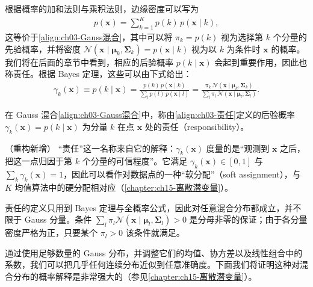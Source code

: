 \documentclass[../../main.tex]{subfiles}
\begin{document}
根据概率的加和法则与乘积法则，边缘密度可以写为
\begin{align}
p(\boldsymbol{x})=\sum_{k=1}^{K}p(k)\,p(\boldsymbol{x}\mid k),
\label{align:ch03-混合生成式}
\end{align}
这等价于\eqref{align:ch03-Gauss混合}，其中可以将 $\pi_{k}=p(k)$ 视为选择第 $k$ 个分量的先验概率，并将密度 $\mathcal{N}(\boldsymbol{x}\mid\boldsymbol{\mu}_{k},\boldsymbol{\Sigma}_{k})=p(\boldsymbol{x}\mid k)$ 视为以 $k$ 为条件时 $\boldsymbol{x}$ 的概率。我们将在后面的章节中看到，相应的后验概率 $p(k\mid\boldsymbol{x})$ 会起到重要作用，因此也称责任。根据 Bayes 定理，这些可以由下式给出：
\begin{align}
\gamma_{k}(\boldsymbol{x})\equiv p(k\mid\boldsymbol{x})=\frac{p(k)\,p(\boldsymbol{x}\mid k)}{\sum_{l}p(l)\,p(\boldsymbol{x}\mid l)}=\frac{\pi_{k}\,\mathcal{N}(\boldsymbol{x}\mid\boldsymbol{\mu}_{k},\boldsymbol{\Sigma}_{k})}{\sum_{l}\pi_{l}\,\mathcal{N}(\boldsymbol{x}\mid\boldsymbol{\mu}_{l},\boldsymbol{\Sigma}_{l})}.
\label{align:ch03-责任}
\end{align}

\begin{definition}[责任]\label{definition:ch03-责任}
在 Gauss 混合\eqref{align:ch03-Gauss混合}中，称由\eqref{align:ch03-责任}定义的后验概率 $\gamma_k(\boldsymbol{x})=p(k\mid\boldsymbol{x})$ 为分量 $k$ 在点 $\boldsymbol{x}$ 处的责任（responsibility）。
\end{definition}

\begin{remark}（重构新增）
“责任”这一名称来自它的解释：$\gamma_k(\boldsymbol{x})$ 度量的是“观测到 $\boldsymbol{x}$ 之后，把这一点归因于第 $k$ 个分量的可信程度”。它满足 $\gamma_k(\boldsymbol{x})\in[0,1]$ 与 $\sum_k\gamma_k(\boldsymbol{x})=1$，因此可以看作对数据点的一种“软分配”（soft assignment），与 $K$ 均值算法中的硬分配相对应（\cref{chapter:ch15-离散潜变量}）。

责任的定义只用到 Bayes 定理与全概率公式，因此对任意混合分布都成立，并不限于 Gauss 分量。条件 $\sum_l\pi_l\mathcal{N}(\boldsymbol{x}\mid\boldsymbol{\mu}_l,\boldsymbol{\Sigma}_l)>0$ 是分母非零的保证；由于各分量密度严格为正，只要某个 $\pi_l>0$ 该条件就满足。
\end{remark}

通过使用足够数量的 Gauss 分布，并调整它们的均值、协方差以及线性组合中的系数，我们可以把几乎任何连续分布近似到任意准确度。下面我们将证明这种对混合分布的概率解释是非常强大的（参见\cref{chapter:ch15-离散潜变量}）。
\end{document}
